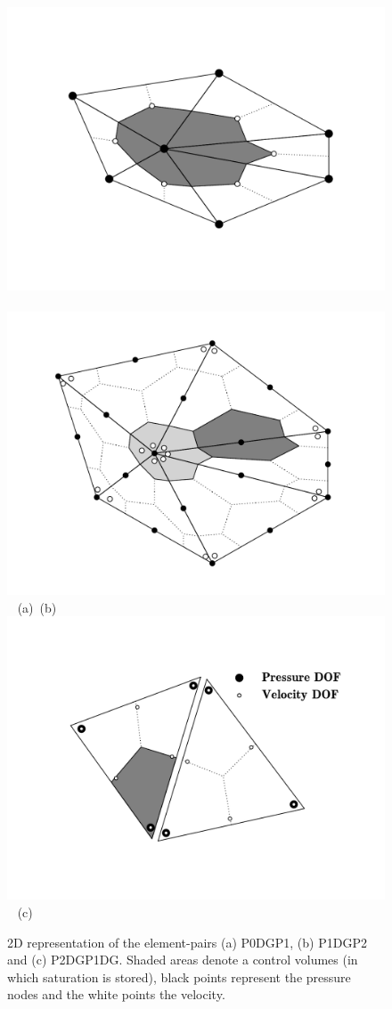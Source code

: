 
\begin{figure}[h]
\vbox{
\hbox{\hspace{-0.5cm}\includegraphics[width=.6\textwidth]{diagrams/p0dgp1-cont-sat} 
\hspace{-.9cm}\includegraphics[width=.6\textwidth]{diagrams/p1dgp2-cont-sat} }
\hbox{\hspace{4cm}(a) \hspace{6.5cm}(b)}
\vspace{0.cm}
\hbox{\hspace{2.5cm}\includegraphics[width=.8\textwidth]{diagrams/p2dgp1-dg-sat} }
\vspace{-0.3cm}
\hbox{\hspace{6cm}(c) }
}
\caption{2D representation of the element-pairs (a) P0DGP1, (b) P1DGP2  and (c) P2DGP1DG. Shaded areas denote a control volumes (in which saturation is stored), black points represent the pressure nodes and the white points the velocity.}
  \label{fem_cv_represent_a}
\end{figure}


